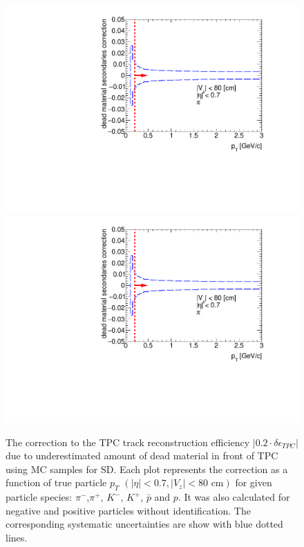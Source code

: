 \begin{figure}[hb]
	\caption[The correction to the TPC track reconstruction efficiency $|0.2\cdot\delta\epsilon_{ TPC}|$ due to underestimated amount of dead material in front of TPC using MC samples for SD]{The correction to the TPC track reconstruction efficiency $|0.2\cdot\delta\epsilon_{ TPC}|$ due to underestimated amount of dead material in front of TPC using MC samples for SD. Each plot represents the correction as a function of true particle $p_T$ $\left(|\eta|<0.7, |V_{z}|<80 \text{ cm}\right)$ for given particle species: $\pi^-$,$\pi^+$, $K^-$, $K^+$, $\bar{p}$ and $p$. It was also calculated for negative and positive particles without identification. The corresponding systematic uncertainties are show with blue dotted lines. }\label{fig:dead_materialSD1D}
	\centering
	\parbox{0.495\textwidth}{
		\centering
		\includegraphics[width=\linewidth,page=1]{graphics/systematicsEfficiency/deadMaterial/secondaries_Unbinned_SD_1D.pdf}\\
		\includegraphics[width=\linewidth,page=2]{graphics/systematicsEfficiency/deadMaterial/secondaries_Unbinned_SD_1D.pdf}\\
}
\end{figure}
